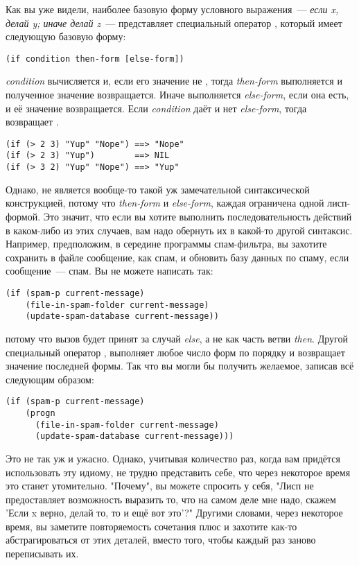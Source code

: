 Как вы уже видели, наиболее базовую форму условного выражения~--- \textit{если x, делай y;
  иначе делай z}~--- представляет специальный оператор , который имеет следующую
базовую форму:

\begin{lstlisting}
(if condition then-form [else-form])
\end{lstlisting}

\textit{condition} вычисляется и, если его значение не , тогда
\textit{then-form} выполняется и полученное значение возвращается. Иначе выполняется
\textit{else-form}, если она есть, и её значение возвращается. Если \textit{condition}
даёт  и нет \textit{else-form}, тогда  возвращает .

\begin{lstlisting}
(if (> 2 3) "Yup" "Nope") ==> "Nope"
(if (> 2 3) "Yup")        ==> NIL
(if (> 3 2) "Yup" "Nope") ==> "Yup"
\end{lstlisting}

Однако,  не является вообще-то такой уж замечательной синтаксической
конструкцией, потому что \textit{then-form} и \textit{else-form}, каждая ограничена одной
лисп-формой. Это значит, что если вы хотите выполнить последовательность действий в
каком-либо из этих случаев, вам надо обернуть их в какой-то другой синтаксис. Например,
предположим, в середине программы спам-фильтра, вы захотите сохранить в файле сообщение,
как спам, и обновить базу данных по спаму, если сообщение~--- спам. Вы не можете написать
так:

\begin{lstlisting}
(if (spam-p current-message)
    (file-in-spam-folder current-message)
    (update-spam-database current-message))
\end{lstlisting}

потому что вызов  будет принят за случай \textit{else}, а не
как часть ветви \textit{then}. Другой специальный оператор , выполняет любое
число форм по порядку и возвращает значение последней формы. Так что вы могли бы получить
желаемое, записав всё следующим образом:

\begin{lstlisting}
(if (spam-p current-message)
    (progn
      (file-in-spam-folder current-message)
      (update-spam-database current-message)))
\end{lstlisting}

Это не так уж и ужасно. Однако, учитывая количество раз, когда вам придётся использовать
эту идиому, не трудно представить себе, что через некоторое время это станет
утомительно. "Почему", вы можете спросить у себя, "Лисп не предоставляет возможность
выразить то, что на самом деле мне надо, скажем 'Если x верно, делай то, то и ещё вот
это'?" Другими словами, через некоторое время, вы заметите повторяемость сочетания
 плюс  и захотите как-то абстрагироваться от этих деталей, вместо
того, чтобы каждый раз заново переписывать их.

